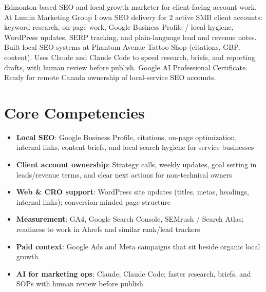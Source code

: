 \documentclass[11pt,a4paper,sans]{moderncv}
\begin{document}
\makecvtitle

\vspace{6pt}
\small{Edmonton-based SEO and local growth marketer for client-facing account work. At Lumin Marketing Group I own SEO delivery for 2 active SMB client accounts: keyword research, on-page work, Google Business Profile / local hygiene, WordPress updates, SERP tracking, and plain-language lead and revenue notes. Built local SEO systems at Phantom Avenue Tattoo Shop (citations, GBP, content). Uses Claude and Claude Code to speed research, briefs, and reporting drafts, with human review before publish. Google AI Professional Certificate. Ready for remote Canada ownership of local-service SEO accounts.}

\section{Core Competencies}
\vspace{1pt}
\begin{itemize}
\item \textbf{Local SEO}: Google Business Profile, citations, on-page optimization, internal links, content briefs, and local search hygiene for service businesses
\item \textbf{Client account ownership}: Strategy calls, weekly updates, goal setting in leads/revenue terms, and clear next actions for non-technical owners
\item \textbf{Web \& CRO support}: WordPress site updates (titles, metas, headings, internal links); conversion-minded page structure
\item \textbf{Measurement}: GA4, Google Search Console, SEMrush / Search Atlas; readiness to work in Ahrefs and similar rank/lead trackers
\item \textbf{Paid context}: Google Ads and Meta campaigns that sit beside organic local growth
\item \textbf{AI for marketing ops}: Claude, Claude Code; faster research, briefs, and SOPs with human review before publish
\end{itemize}
\end{document}
